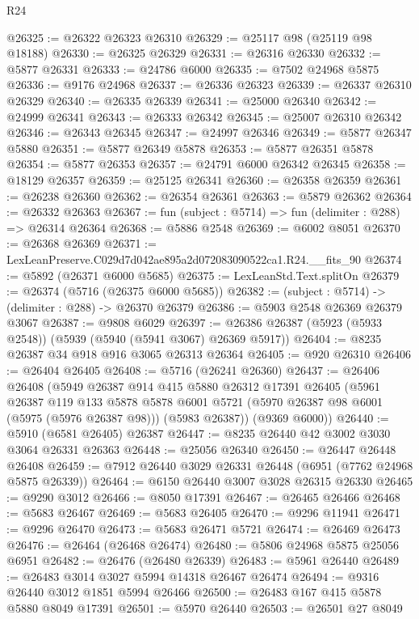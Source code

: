 \begin{lexlean}{R24}
\begin{coremodule}
@26325 := @26322 @26323 @26310
@26329 := @25117 @98 (@25119 @98 @18188)
@26330 := @26325 @26329
@26331 := @26316 @26330
@26332 := @5877 @26331
@26333 := @24786 @6000
@26335 := @7502 @24968 @5875
@26336 := @9176 @24968
@26337 := @26336 @26323
@26339 := @26337 @26310 @26329
@26340 := @26335 @26339
@26341 := @25000 @26340
@26342 := @24999 @26341
@26343 := @26333 @26342
@26345 := @25007 @26310 @26342
@26346 := @26343 @26345
@26347 := @24997 @26346
@26349 := @5877 @26347 @5880
@26351 := @5877 @26349 @5878
@26353 := @5877 @26351 @5878
@26354 := @5877 @26353
@26357 := @24791 @6000 @26342 @26345
@26358 := @18129 @26357
@26359 := @25125 @26341
@26360 := @26358 @26359
@26361 := @26238 @26360
@26362 := @26354 @26361
@26363 := @5879 @26362
@26364 := @26332 @26363
@26367 := fun (subject : @5714) => fun (delimiter : @288) => @26314 @26364
@26368 := @5886 @2548
@26369 := @6002 @8051
@26370 := @26368 @26369
@26371 := LexLeanPreserve.C029d7d042ae895a2d072083090522ca1.R24.__fits_90
@26374 := @5892 (@26371 @6000 @5685)
@26375 := LexLeanStd.Text.splitOn
@26379 := @26374 (@5716 (@26375 @6000 @5685))
@26382 := (subject : @5714) -> (delimiter : @288) -> @26370 @26379
@26386 := @5903 @2548 @26369 @26379 @3067
@26387 := @9808 @6029
@26397 := @26386 @26387 (@5923 (@5933 @2548)) (@5939 (@5940 (@5941 @3067) @26369 @5917))
@26404 := @8235 @26387 @34 @918 @916 @3065 @26313 @26364
@26405 := @920 @26310
@26406 := @26404 @26405
@26408 := @5716 (@26241 @26360)
@26437 := @26406
    @26408
    (@5949
      @26387
      @914
      @415
      @5880
      @26312
      @17391
      @26405
      (@5961
        @26387
        @119
        @133
        @5878
        @5878
        @6001
        @5721
        (@5970 @26387 @98 @6001 (@5975 (@5976 @26387 @98)))
        (@5983 @26387))
      (@9369 @6000))
@26440 := @5910 (@6581 @26405) @26387
@26447 := @8235 @26440 @42 @3002 @3030 @3064 @26331 @26363
@26448 := @25056 @26340
@26450 := @26447 @26448 @26408
@26459 := @7912 @26440 @3029 @26331 @26448 (@6951 (@7762 @24968 @5875 @26339))
@26464 := @6150 @26440 @3007 @3028 @26315 @26330
@26465 := @9290 @3012
@26466 := @8050 @17391
@26467 := @26465 @26466
@26468 := @5683 @26467
@26469 := @5683 @26405
@26470 := @9296 @11941
@26471 := @9296 @26470
@26473 := @5683 @26471 @5721
@26474 := @26469 @26473
@26476 := @26464 (@26468 @26474)
@26480 := @5806 @24968 @5875 @25056 @6951
@26482 := @26476 (@26480 @26339)
@26483 := @5961 @26440
@26489 := @26483 @3014 @3027 @5994 @14318 @26467 @26474
@26494 := @9316 @26440 @3012 @1851 @5994 @26466
@26500 := @26483 @167 @415 @5878 @5880 @8049 @17391
@26501 := @5970 @26440
@26503 := @26501 @27 @8049

\end{coremodule}
\end{lexlean}
